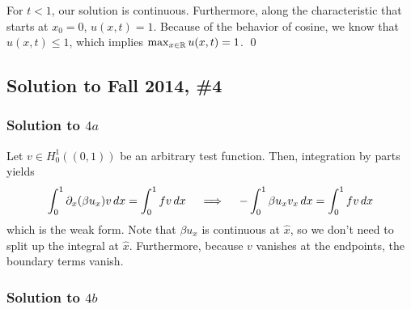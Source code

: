 For $t < 1$, our solution is continuous. Furthermore, along the characteristic that starts at $x_0 = 0$, $u(x,t) = 1$. Because of the behavior of cosine, we know that $u(x,t) \leq 1$, which implies $\max_{x \in \mathbb{R}} u(x,t) = 1$. \hfill \qed






\subsection*{Solution to Fall 2014, \#4}
\label{F14Q4}

\subsubsection*{Solution to $4a$}

Let $v \in H^1_0((0,1))$ be an arbitrary test function. Then, integration by parts yields
$$ \int_0^1 \partial_x(\beta u_x) v \, dx = \int_0^1 fv \, dx \quad \implies \quad -\int_0^1 \beta u_x v_x \, dx = \int_0^1 fv \, dx $$
which is the weak form. Note that $\beta u_x$ is continuous at $\hat{x}$, so we don't need to split up the integral at $\hat{x}$. Furthermore, because $v$ vanishes at the endpoints, the boundary terms vanish.

\subsubsection*{Solution to $4b$}

